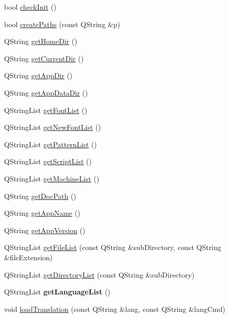 \begin{DoxyCompactItemize}
\item 
bool \hyperlink{classRS__System_a659df7be14487e01da17512639506984}{check\-Init} ()
\item 
bool \hyperlink{classRS__System_a71fa72d2e0d2b5ece0c2bb5dfb2a2bdb}{create\-Paths} (const Q\-String \&p)
\item 
Q\-String \hyperlink{classRS__System_a169a410fb7c0f843624c14389391cb01}{get\-Home\-Dir} ()
\item 
Q\-String \hyperlink{classRS__System_a4a3aa12f9531e9dc3bc8589b508eb832}{get\-Current\-Dir} ()
\item 
Q\-String \hyperlink{classRS__System_a7094cceb1e25d11c3176e215b4663af4}{get\-App\-Dir} ()
\item 
Q\-String \hyperlink{classRS__System_a3e96a3d71a6a039b5d7ecc71b2568fa5}{get\-App\-Data\-Dir} ()
\item 
Q\-String\-List \hyperlink{classRS__System_a3418ba822d0d1edab8f75b87c196f687}{get\-Font\-List} ()
\item 
Q\-String\-List \hyperlink{classRS__System_aeade79f9340e4d20ff9d413ce51c4f1a}{get\-New\-Font\-List} ()
\item 
Q\-String\-List \hyperlink{classRS__System_ae49613ad49e589c4eb0a3554b5872d6f}{get\-Pattern\-List} ()
\item 
Q\-String\-List \hyperlink{classRS__System_a486e47811cbad1987c47bd1c2a0a28f8}{get\-Script\-List} ()
\item 
Q\-String\-List \hyperlink{classRS__System_adb669795cc5e0efa1cd960c4c4f7a124}{get\-Machine\-List} ()
\item 
Q\-String \hyperlink{classRS__System_ade0d60d1aece6b9f10c1ac21132abfc0}{get\-Doc\-Path} ()
\item 
Q\-String \hyperlink{classRS__System_a5f90f6a18e8e586e701835ae3196edd4}{get\-App\-Name} ()
\item 
Q\-String \hyperlink{classRS__System_a07efe8e59894307022bbf020d3282f19}{get\-App\-Version} ()
\item 
Q\-String\-List \hyperlink{classRS__System_a1667436d300a39666a8c06024ebb8c06}{get\-File\-List} (const Q\-String \&sub\-Directory, const Q\-String \&file\-Extension)
\item 
Q\-String\-List \hyperlink{classRS__System_ae2658670b2384d06ad3ff2e8e3132b2d}{get\-Directory\-List} (const Q\-String \&sub\-Directory)
\item 
\hypertarget{classRS__System_abfa6fc249a8e1dcf29b3c5f30ddb75d2}{Q\-String\-List {\bfseries get\-Language\-List} ()}\label{classRS__System_abfa6fc249a8e1dcf29b3c5f30ddb75d2}

\item 
void \hyperlink{classRS__System_a8b26bcf968f27491d47b874c4dc82a72}{load\-Translation} (const Q\-String \&lang, const Q\-String \&lang\-Cmd)
\end{DoxyCompactItemize}
